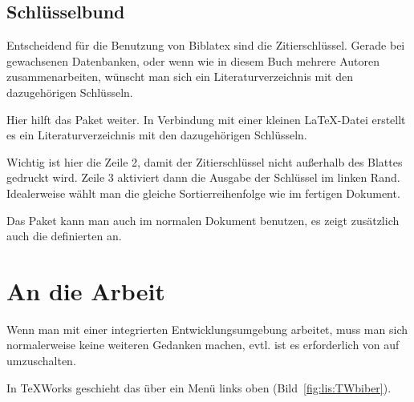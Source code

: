 \subsection{Schlüsselbund}

Entscheidend für die Benutzung von Biblatex sind die Zitierschlüssel.
Gerade bei gewachsenen Datenbanken,
oder wenn wie in diesem Buch mehrere Autoren zusammenarbeiten,
wünscht man sich ein Literaturverzeichnis mit den dazugehörigen Schlüsseln.

Hier hilft das Paket  weiter.
In Verbindung mit einer kleinen \LaTeX-Datei erstellt es ein Literaturverzeichnis mit den dazugehörigen Schlüsseln.


Wichtig ist hier die Zeile 2, damit der Zitierschlüssel nicht außerhalb des Blattes gedruckt wird.
Zeile 3 aktiviert dann die Ausgabe der Schlüssel im linken Rand.
Idealerweise wählt man die gleiche Sortierreihenfolge wie im fertigen Dokument.

Das Paket  kann man auch im normalen Dokument benutzen, 
es zeigt zusätzlich auch die definierten  an.

\section{An die Arbeit}

Wenn man mit einer integrierten Entwicklungsumgebung arbeitet, 
muss man sich normalerweise keine weiteren Gedanken machen,
evtl. ist es erforderlich von  auf  umzuschalten.

In TeXWorks geschieht das über ein Menü links oben (Bild~\ref{fig:lis:TWbiber}).

